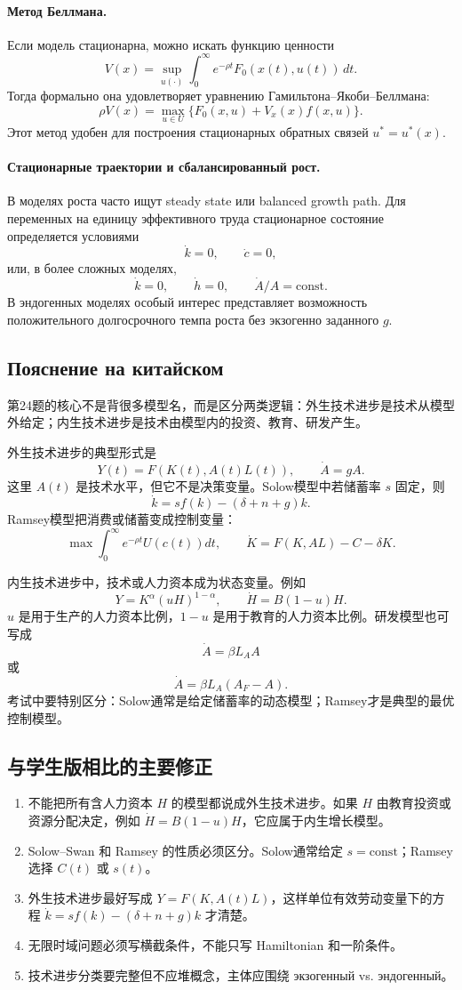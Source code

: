 \documentclass[12pt,a4paper]{article}
\begin{document}
\paragraph{Метод Беллмана.}
Если модель стационарна, можно искать функцию ценности
\[
V(x)=\sup_{u(\cdot)}\int_0^\infty e^{-\rho t}F_0(x(t),u(t))\,dt.
\]
Тогда формально она удовлетворяет уравнению Гамильтона--Якоби--Беллмана:
\[
\rho V(x)=\max_{u\in U}\{F_0(x,u)+V_x(x)f(x,u)\}.
\]
Этот метод удобен для построения стационарных обратных связей $u^*=u^*(x)$.

\paragraph{Стационарные траектории и сбалансированный рост.}
В моделях роста часто ищут steady state или balanced growth path. Для переменных на единицу эффективного труда стационарное состояние определяется условиями
\[
\dot k=0,\qquad \dot c=0,
\]
или, в более сложных моделях,
\[
\dot k=0,\qquad \dot h=0,\qquad \dot A/A=\mathrm{const}.
\]
В эндогенных моделях особый интерес представляет возможность положительного долгосрочного темпа роста без экзогенно заданного $g$.

\subsection{Пояснение на китайском}
第24题的核心不是背很多模型名，而是区分两类逻辑：外生技术进步是技术从模型外给定；内生技术进步是技术由模型内的投资、教育、研发产生。

外生技术进步的典型形式是
\[
Y(t)=F(K(t),A(t)L(t)),\qquad \dot A=gA.
\]
这里 $A(t)$ 是技术水平，但它不是决策变量。Solow模型中若储蓄率 $s$ 固定，则
\[
\dot k=sf(k)-(\delta+n+g)k.
\]
Ramsey模型把消费或储蓄变成控制变量：
\[
\max\int_0^\infty e^{-\rho t}U(c(t))dt,
\qquad
\dot K=F(K,AL)-C-\delta K.
\]

内生技术进步中，技术或人力资本成为状态变量。例如
\[
Y=K^\alpha(uH)^{1-\alpha},\qquad \dot H=B(1-u)H.
\]
$u$ 是用于生产的人力资本比例，$1-u$ 是用于教育的人力资本比例。研发模型也可写成
\[
\dot A=\beta L_AA
\]
或
\[
\dot A=\beta L_A(A_F-A).
\]
考试中要特别区分：Solow通常是给定储蓄率的动态模型；Ramsey才是典型的最优控制模型。

\subsection{与学生版相比的主要修正}
\begin{enumerate}
\item 不能把所有含人力资本 $H$ 的模型都说成外生技术进步。如果 $H$ 由教育投资或资源分配决定，例如 $\dot H=B(1-u)H$，它应属于内生增长模型。
\item Solow--Swan 和 Ramsey 的性质必须区分。Solow通常给定 $s=\mathrm{const}$；Ramsey选择 $C(t)$ 或 $s(t)$。
\item 外生技术进步最好写成 $Y=F(K,A(t)L)$，这样单位有效劳动变量下的方程 $\dot k=sf(k)-(\delta+n+g)k$ 才清楚。
\item 无限时域问题必须写横截条件，不能只写 Hamiltonian 和一阶条件。
\item 技术进步分类要完整但不应堆概念，主体应围绕 экзогенный vs. эндогенный。
\end{enumerate}
\end{document}
